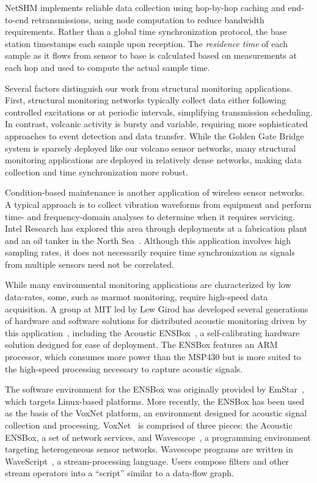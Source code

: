 NetSHM implements reliable data collection using hop-by-hop caching and
end-to-end retransmissions, using node computation to reduce bandwidth
requirements. Rather than a global time synchronization protocol, the base
station timestamps each sample upon reception. The \textit{residence time} of
each sample as it flows from sensor to base is calculated based on
measurements at each hop and used to compute the actual sample time.

Several factors distinguish our work from structural monitoring applications.
First, structural monitoring networks typically collect data either following
controlled excitations or at periodic intervals, simplifying transmission
scheduling. In contrast, volcanic activity is bursty and variable, requiring
more sophisticated approaches to event detection and data transfer. While the
Golden Gate Bridge system is sparsely deployed like our volcano sensor
networks, many structural monitoring applications are deployed in relatively
dense networks, making data collection and time synchronization more robust. 

Condition-based maintenance is another application of wireless sensor
networks. A typical approach is to collect vibration waveforms from equipment
and perform time- and frequency-domain analyses to determine when it requires
servicing. Intel Research has explored this area through deployments at a
fabrication plant and an oil tanker in the North
Sea~\cite{intel-northseasensys}. Although this application involves high
sampling rates, it does not necessarily require time synchronization as
signals from multiple sensors need not be correlated. 

While many environmental monitoring applications are characterized by low
data-rates, some, such as marmot monitoring, require high-speed data
acquisition. A group at MIT led by Lew Girod has developed several
generations of hardware and software solutions for distributed acoustic
monitoring driven by this application~\cite{girod-marmots}, including the
Acoustic ENSBox~\cite{girod-ensbox}, a self-calibrating hardware solution
designed for ease of deployment. The ENSBox features an ARM processor, which
consumes more power than the MSP430 but is more suited to the high-speed
processing necessary to capture acoustic signals.

The software environment for the ENSBox was originally provided by
EmStar~\cite{emstar}, which targets Linux-based platforms. More recently, the
ENSBox has been used as the basis of the VoxNet platform, an environment
designed for acoustic signal collection and processing.
VoxNet~\cite{voxnet-ipsn08} is comprised of three pieces: the Acoustic
ENSBox, a set of network services, and Wavescope~\cite{wavescope}, a
programming environment targeting heterogeneous sensor networks. Wavescope
programs are written in WaveScript~\cite{wavescript-techreport08}, a
stream-processing language. Users compose filters and other stream operators
into a ``script'' similar to a data-flow graph.


